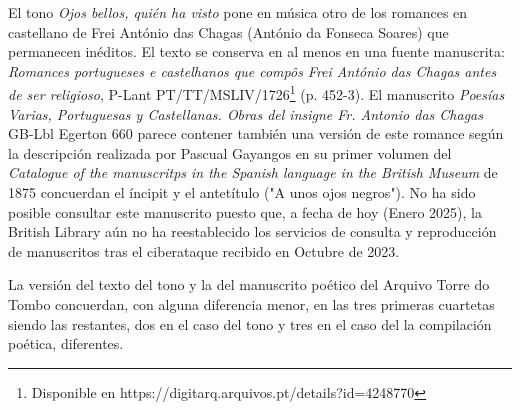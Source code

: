 
El tono \textit{Ojos bellos, quién ha visto} pone en música otro de los romances en castellano de Frei António das Chagas (António da Fonseca Soares) que permanecen inéditos. El texto se conserva en al menos en una fuente manuscrita: \textit{Romances portugueses e castelhanos que compôs Frei António das Chagas antes de ser religioso}, P-Lant PT/TT/MSLIV/1726\footnote{\textsuperscript{}Disponible en https://digitarq.arquivos.pt/details?id=4248770} (p. 452-3). El manuscrito \textit{Poesías Varias, Portuguesas y Castellanas. Obras del insigne Fr. Antonio das Chagas} GB-Lbl Egerton 660 parece contener también una versión de este romance según la descripción realizada por Pascual Gayangos en su primer volumen del \textit{Catalogue of the manuscritps in the Spanish language in the British Museum} de 1875 concuerdan el íncipit y el antetítulo ("A unos ojos negros"). No ha sido posible consultar este manuscrito puesto que, a fecha de hoy (Enero 2025), la British Library aún no ha reestablecido los servicios de consulta y reproducción de manuscritos tras el ciberataque recibido en Octubre de 2023.

La versión del texto del tono y la del manuscrito poético del Arquivo Torre do Tombo concuerdan, con alguna diferencia menor, en las tres primeras cuartetas siendo las restantes, dos en el caso del tono y tres en el caso del la compilación poética, diferentes. 
